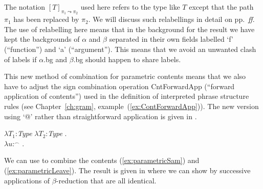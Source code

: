 The notation $[T]_{\pi_1\leadsto\pi_2}$ used here refers to the type
like $T$ except that the path $\pi_1$ has been replaced by $\pi_2$.
We will discuss such relabellings in detail on pp.~\pageref{pg:relabelling-intro}\textit{ff}.
The use of relabelling here means that in the background for the result we have kept the
backgrounds of $\alpha$ and $\beta$
separated in their own fields labelled `f' (``function'') and `a'
(``argument''). %
This means that we avoid an unwanted clash of labels
if $\alpha$.bg and $\beta$.bg should happen to share
labels.

This new method of combination for parametric contents means that we
also have to adjust the sign combination operation CntForwardApp
(``forward application of contents'') used in the definition of
interpreted phrase structure rules (see Chapter~\ref{ch:gram},
example~(\ref{ex:ContForwardApp})).  The new version using `@' rather
than straightforward application is given in \nexteg{}.
\begin{ex} 
$\lambda T_1$:\textit{Type} $\lambda T_2$:\textit{Type} . \\
\hspace*{1em}$\lambda
u$:$^{\frown}$
    . \\
\hspace*{2em}  
\end{ex} 
  

We can use \preveg{} to combine the contents (\ref{ex:parametricSam}) and
(\ref{ex:parametricLeave}).  The result is given in \nexteg{} where we can
show by successive applications of $\beta$-reduction that
 are all identical.



